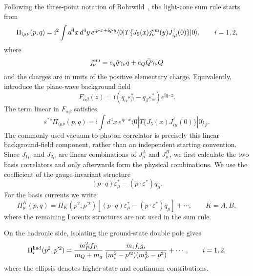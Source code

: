 \documentclass[aps,prd,preprint,nofootinbib,superscriptaddress]{revtex4-2}
\newcommand{\ii}{\mathrm{i}}
\begin{document}
Following the three-point notation of Rohrwild~\cite{Rohrwild:2007yt}, the
light-cone sum rule starts from
\begin{equation}
  \Pi_{i\mu\nu}(p,q)=\ii^2\int d^4x\,d^4y\,
  e^{\ii p\cdot x+\ii q\cdot y}
  \langle0|T\{J_5(x)j_\nu^{\rm em}(y)J_{i\mu}^{\dagger}(0)\}|0\rangle,
  \qquad i=1,2,
  \label{eq:corr-physical}
\end{equation}
where
\begin{equation}
  j_\nu^{\rm em}=e_q\bar q\gamma_\nu q+e_Q\bar Q\gamma_\nu Q
\end{equation}
and the charges are in units of the positive elementary charge.  Equivalently,
introduce the plane-wave background field
\begin{equation}
  F_{\alpha\beta}(z)=\ii
  (q_\alpha\varepsilon_\beta^*-q_\beta\varepsilon_\alpha^*)
  e^{\ii q\cdot z}.
\end{equation}
The term linear in $F_{\alpha\beta}$ satisfies
\begin{equation}
  \varepsilon^{*\nu}\Pi_{i\mu\nu}(p,q)
  =\ii\int d^4x\,e^{\ii p\cdot x}
  \langle0|T\{J_5(x)J_{i\mu}^{\dagger}(0)\}|0\rangle_F.
  \label{eq:corr-background}
\end{equation}
The commonly used vacuum-to-photon correlator is precisely this linear
background-field component, rather than an independent starting convention.
Since \(J_{1\mu}\) and \(J_{2\mu}\) are linear combinations of \(J^A_\mu\) and
\(J^B_\mu\), we first calculate the two basis correlators and only afterwards
form the physical combinations.  We use the coefficient of the gauge-invariant
structure
\begin{equation}
  (p\cdot q)\varepsilon_\mu^*
  -(p\cdot\varepsilon^*)q_\mu .
  \label{eq:projector}
\end{equation}
For the basis currents we write
\begin{equation}
  \Pi^K_\mu(p,q)=
  \Pi_K(p^2,p^{\prime2})
  \left[
  (p\cdot q)\varepsilon_\mu^*
  -(p\cdot\varepsilon^*)q_\mu
  \right]
  +\cdots ,
  \qquad K=A,B ,
  \label{eq:basis-decomp}
\end{equation}
where the remaining Lorentz structures are not used in the sum rule.

On the hadronic side, isolating the ground-state double pole gives
\begin{equation}
  \Pi^{\rm had}_{i}(p^2,p^{\prime2})
  =
  \frac{m_P^2 f_P}{m_Q+m_q}\,
  \frac{m_i f_i g_i}
  {(m_i^2-p^{\prime2})(m_P^2-p^2)}
  +\cdots ,
  \qquad i=1,2 ,
  \label{eq:hadronic-invariant}
\end{equation}
where the ellipsis denotes higher-state and continuum contributions.
\end{document}
